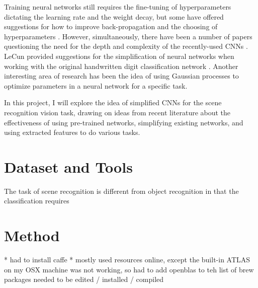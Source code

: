 \documentclass[10pt]{article}
\begin{document}
Training neural networks still requires the fine-tuning of hyperparameters dictating the learning rate and the weight decay, but some have offered suggestions for how to improve back-propagation and the choosing of hyperparameters \cite{bottou_large-scale_2010}. However, simultaneously, there have been a number of papers questioning the need for the depth and complexity of the recently-used CNNs \cite{ba_deep_2013}. LeCun provided suggestions for the simplification of neural networks when working with the original handwritten digit classification network \cite{lecun_optimal_1989}. Another interesting area of research has been the idea of using Gaussian processes to optimize parameters in a neural network for a specific task. 

In this project, I will explore the idea of simplified CNNs for the scene recognition vision task, drawing on ideas from recent literature about the effectiveness of using pre-trained networks, simplifying existing networks, and using extracted features to do various tasks. 

\section{Dataset and Tools}

The task of scene recognition is different from object recognition in that the classification requires 




\section{Method}

* had to install caffe
* mostly used resources online, except the built-in ATLAS on my OSX machine was not working, so had to add openblas to teh list of brew packages needed to be edited / installed / compiled
\end{document}
